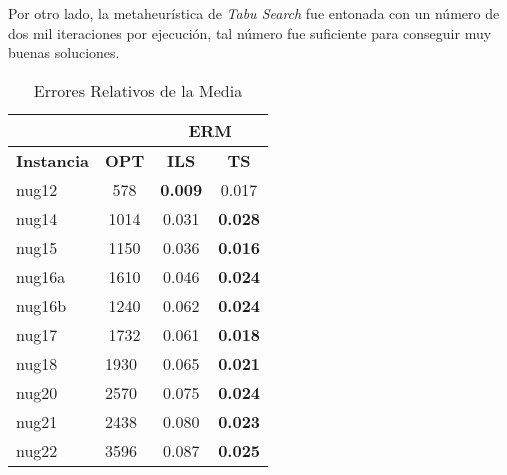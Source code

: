 \documentclass{ci5652}
\begin{document}
Por otro lado, la metaheurística de \textit{Tabu Search} fue entonada con un número de dos mil iteraciones por ejecución, tal número fue suficiente para conseguir muy buenas soluciones. 

\begin{table}[ht]
  \label{table:erm}
    \caption{Errores Relativos de la Media}
    \centering
    \begin{tabular}{ll|c|c|}
    \cline{3-4}
                                             & \multicolumn{1}{c|}{\textbf{}}    & \multicolumn{2}{c|}{\textbf{ERM}} \\ \hline
  \multicolumn{1}{|l|}{\textbf{Instancia}} & \multicolumn{1}{c|}{\textbf{OPT}} & \textbf{ILS}                & \textbf{TS}                \\ \hline
  \multicolumn{1}{|l|}{nug12}              & \multicolumn{1}{c|}{578}          & \textbf{0.009}              & 0.017                      \\ \hline
  \multicolumn{1}{|l|}{nug14}              & \multicolumn{1}{c|}{1014}         & 0.031                       & \textbf{0.028}             \\ \hline
  \multicolumn{1}{|l|}{nug15}              & \multicolumn{1}{c|}{1150}         & 0.036                       & \textbf{0.016}             \\ \hline
  \multicolumn{1}{|l|}{nug16a}             & \multicolumn{1}{c|}{1610}         & 0.046                       & \textbf{0.024}             \\ \hline
  \multicolumn{1}{|l|}{nug16b}             & \multicolumn{1}{c|}{1240}         & 0.062                       & \textbf{0.024}             \\ \hline
  \multicolumn{1}{|l|}{nug17}              & \multicolumn{1}{c|}{1732}         & 0.061                       & \textbf{0.018}             \\ \hline
  \multicolumn{1}{|l|}{nug18}              & 1930                              & 0.065                       & \textbf{0.021}             \\ \hline
  \multicolumn{1}{|l|}{nug20}              & 2570                              & 0.075                       & \textbf{0.024}             \\ \hline
  \multicolumn{1}{|l|}{nug21}              & 2438                              & 0.080                       & \textbf{0.023}             \\ \hline
  \multicolumn{1}{|l|}{nug22}              & 3596                              & 0.087                       & \textbf{0.025}             \\ \hline

\end{tabular}
\end{table}
\end{document}
